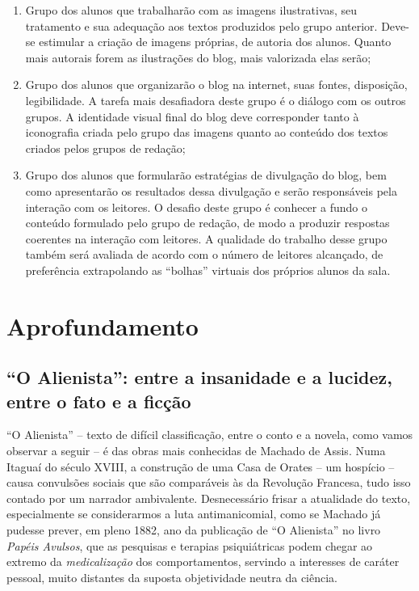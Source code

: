 \documentclass{extarticle}
\begin{document}
\begin{enumerate}
\begin{enumerate}
\item Grupo dos alunos que trabalharão com as imagens ilustrativas, seu
tratamento e sua adequação aos textos produzidos pelo grupo anterior.
Deve-se estimular a criação de imagens próprias, de autoria dos alunos.
Quanto mais autorais forem as ilustrações do blog, mais valorizada elas
serão;

\item Grupo dos alunos que organizarão o blog na internet, suas fontes,
disposição, legibilidade. A tarefa mais desafiadora deste grupo é o
diálogo com os outros grupos. A identidade visual final do blog deve
corresponder tanto à iconografia criada pelo grupo das imagens quanto ao
conteúdo dos textos criados pelos grupos de redação;

\item Grupo dos alunos que formularão estratégias de divulgação do blog,
bem como apresentarão os resultados dessa divulgação e serão
responsáveis pela interação com os leitores. O desafio deste grupo é
conhecer a fundo o conteúdo formulado pelo grupo de redação, de modo a
produzir respostas coerentes na interação com leitores. A qualidade do
trabalho desse grupo também será avaliada de acordo com o número de
leitores alcançado, de preferência extrapolando as ``bolhas'' virtuais
dos próprios alunos da sala.
\end{enumerate}
\end{enumerate}

\section{Aprofundamento}

\subsection{``O Alienista'': entre a insanidade e a lucidez, entre o fato e a ficção}

``O Alienista'' -- texto de difícil classificação, entre o conto e a
novela, como vamos observar a seguir -- é das obras mais conhecidas de
Machado de Assis. Numa Itaguaí do século XVIII, a construção de uma Casa
de Orates -- um hospício -- causa convulsões sociais que são comparáveis
às da Revolução Francesa, tudo isso contado por um narrador ambivalente.
Desnecessário frisar a atualidade do texto, especialmente se
considerarmos a luta antimanicomial, como se Machado já pudesse prever,
em pleno 1882, ano da publicação de ``O Alienista'' no livro
\emph{Papéis Avulsos}, que as pesquisas e terapias psiquiátricas podem
chegar ao extremo da \emph{medicalização} dos comportamentos, servindo a
interesses de caráter pessoal, muito distantes da suposta objetividade
neutra da ciência.
\end{document}
